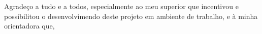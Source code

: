 \begin{agradecimentos}[AGRADECIMENTOS]

Agradeço a tudo e a todos, especialmente ao meu superior que incentivou e possibilitou o desenvolvimendo deste projeto em ambiente de trabalho, e à minha orientadora que,

\end{agradecimentos}

